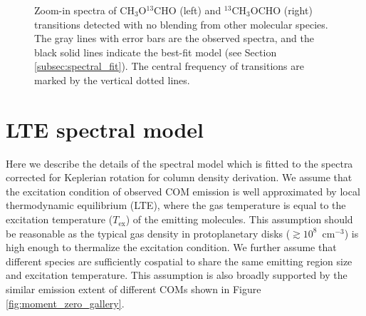 \documentclass[linenumbers, twocolumn, twocolappendix, astrosymb, times]{aastex631}
\newcommand{\methanol}{CH$_3$OH\xspace}
\newcommand{\acetaldehyde}{CH$_3$CHO\xspace}
\begin{document}



\begin{figure*}
\caption{Zoom-in spectra of CH$_3$O$^{13}$CHO (left) and $^{13}$CH$_3$OCHO (right) transitions detected with no blending from other molecular species. The gray lines with error bars are the observed spectra, and the black solid lines indicate the best-fit model (see Section \ref{subsec:spectral_fit}). The central frequency of transitions are marked by the vertical dotted lines.}
\label{fig:13C-methylformate_spectra}
\end{figure*}



\section{LTE spectral model}\label{appendix:spectral_model}
Here we describe the details of the spectral model which is fitted to the spectra corrected for Keplerian rotation for column density derivation. We assume that the excitation condition of observed COM emission is well approximated by local thermodynamic equilibrium (LTE), where the gas temperature is equal to the excitation temperature ($T_\mathrm{ex}$) of the emitting molecules. This assumption should be reasonable as the typical gas density in protoplanetary disks ($\gtrsim10^8$\, cm$^{-3}$) is high enough to thermalize the excitation condition. 
We further assume that different species are sufficiently cospatial to share the same emitting region size and excitation temperature. This assumption is also broadly supported by the similar emission extent of different COMs shown in Figure \ref{fig:moment_zero_gallery}. 
\end{document}
